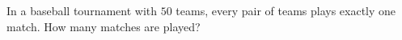 In a baseball tournament with $50$ teams, every pair of teams plays exactly one match. How many matches are played?
